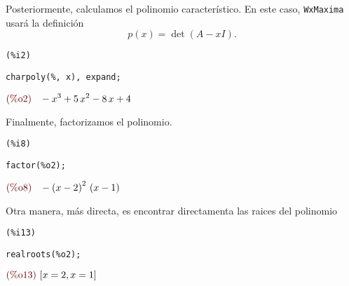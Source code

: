\begin{solucion}
Posteriormente, calculamos el polinomio característico. En este caso, \texttt{WxMaxima} usará la definición $$
p(x)=\det\left( A-xI \right).
$$
\noindent
\begin{minipage}{8ex}{\color{red}\bf
\begin{verbatim}
(%i2)
\end{verbatim}}
\end{minipage}
\begin{minipage}{\textwidth}{\color{blue}
\begin{verbatim}
charpoly(%, x), expand;
\end{verbatim}}
\end{minipage}
\begin{math}\displaystyle
\parbox{8ex}{\color{labelcolor}(\%o2) }
-{x}^{3}+5\,{x}^{2}-8\,x+4
\end{math}

Finalmente, factorizamos el polinomio.
\noindent
\begin{minipage}{8ex}{\color{red}\bf
\begin{verbatim}
(%i8)
\end{verbatim}}
\end{minipage}
\begin{minipage}{\textwidth}{\color{blue}
\begin{verbatim}
factor(%o2);
\end{verbatim}}
\end{minipage}
\begin{math}\displaystyle
\parbox{8ex}{\color{labelcolor}(\%o8) }
-{\left( x-2\right) }^{2}\,\left( x-1\right)
\end{math}

Otra manera, más directa, es encontrar directamenta las raices del polinomio

\noindent
\begin{minipage}{8ex}{\color{red}\bf
\begin{verbatim}
(%i13)
\end{verbatim}}
\end{minipage}
\begin{minipage}{\textwidth}{\color{blue}
\begin{verbatim}
realroots(%o2);
\end{verbatim}}
\end{minipage}
\begin{math}\displaystyle
\parbox{8ex}{\color{labelcolor}(\%o13) }
[x=2,x=1]
\end{math}


\end{solucion}
